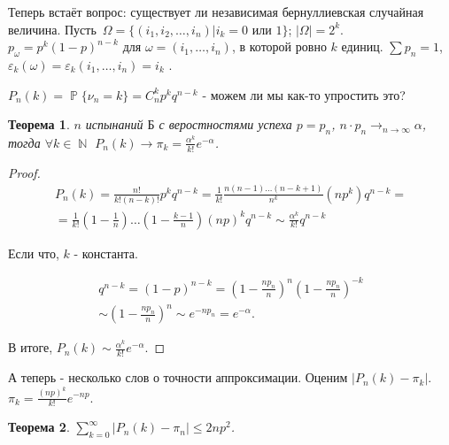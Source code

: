 \documentclass[a4paper,100pt]{article}
\theoremstyle{indented}
\newtheorem{theorem}{Теорема}
\theoremstyle{definition}
\theoremstyle{remark}
\DeclareMathOperator{\NN}{\mathbb{N}}
\DeclareMathOperator{\PP}{\mathbb{P}}
\begin{document}
Теперь встаёт вопрос: существует ли независимая бернуллиевская случайная величина. Пусть $\Omega=\{(i_1, i_2, \ldots, i_n)|i_k=0 \text{ или }1\}$; $|\Omega|=2^k$. $p_{\omega}= p^k(1-p)^{n-k}$ для $\omega=(i_1, \ldots, i_n)$, в которой ровно $k$ единиц. $\sum p_n=1$, $\varepsilon_k(\omega)=\varepsilon_k(i_1, \ldots, i_n)=i_k$ .\

$P_n(k)=\PP\{\nu_n=k\}=C_n^kp^kq^{n-k}$ - можем ли мы как-то упростить это? \\

\begin{theorem}
    $n$ испынаний $\text{Б}$ с веростностями успеха $p=p_n$, $n\cdot p_n\rightarrow_{n\rightarrow \infty} \alpha$, тогда $\forall k\in \NN$ $P_n(k)\rightarrow \pi_k=\frac{\alpha^k}{k!}e^{-\alpha}$. 
\end{theorem}

\begin{proof}
    \begin{equation*}
        \begin{split}
            P_n(k)=\frac{n!}{k!(n-k)!}p^kq^{n-k}=\frac{1}{k!}\frac{n(n-1)\ldots(n-k+1)}{n^k}(np^k)q^{n-k}= \\ 
            = \frac{1}{k!}{(1-\frac{1}{n})\ldots(1-\frac{k-1}{n})}(np)^kq^{n-k}\sim\frac{\alpha^k}{k!}q^{n-k}
        \end{split}
    \end{equation*}

    Если что, $k$ - константа. 

    \begin{equation*}
        \begin{split}
            q^{n-k}=(1-p)^{n-k}=(1-\frac{n p_n}{n})^n(1-\frac{n p_n}{n})^{-k} \\ 
            \sim (1-\frac{n p_n}{n})^n \sim e^{-n p_n} = e^{-\alpha}. 
        \end{split}
    \end{equation*}

    В итоге, $P_n(k)\sim\frac{\alpha^k}{k!}e^{-\alpha}$. 

\end{proof}

А теперь - несколько слов о точности аппроксимации. Оценим $|P_n(k)-\pi_k|$. $\pi_k=\frac{(np)^k}{k!}e^{-np}$. \\

\begin{theorem}
    $\sum_{k=0}^\infty|P_n(k)-\pi_n|\leq 2np^2$.
\end{theorem}
\end{document}
